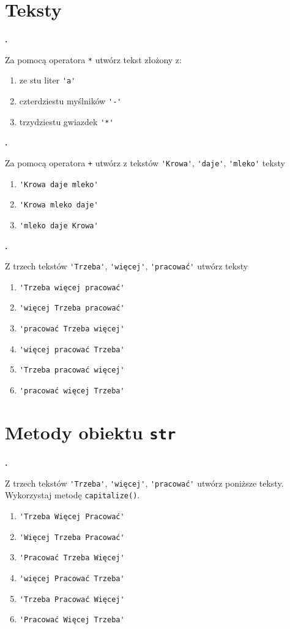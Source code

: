 \documentclass[a4paper]{article}
\begin{document}
\section{Teksty}
\textbf{.}\addtocounter{zadanie}{1} Za pomocą operatora \verb|*| utwórz tekst złożony z:
\begin{enumerate}[label=\arabic*.]
    \item ze stu liter \verb|'a'|
    \item czterdziestu myślników \verb|'-'|
    \item trzydziestu gwiazdek \verb|'*'|
\end{enumerate}


\textbf{.}\addtocounter{zadanie}{1} Za pomocą operatora \verb|+| utwórz z tekstów \verb|'Krowa'|, \verb|'daje'|, \verb|'mleko'| teksty
\begin{enumerate}[label=\arabic*.]
    \item \verb|'Krowa daje mleko'|
    \item \verb|'Krowa mleko daje'|
    \item \verb|'mleko daje Krowa'|
\end{enumerate}


\textbf{.}\addtocounter{zadanie}{1} Z trzech tekstów \verb|'Trzeba'|, \verb|'więcej'|, \verb|'pracować'| utwórz teksty
\begin{enumerate}[label=\arabic*.]
    \item \verb|'Trzeba więcej pracować'|
    \item \verb|'więcej Trzeba pracować'|
    \item \verb|'pracować Trzeba więcej'|
    \item \verb|'więcej pracować Trzeba'|
    \item \verb|'Trzeba pracować więcej'|
    \item \verb|'pracować więcej Trzeba'|
\end{enumerate}

\section{Metody obiektu \texttt{str}}

\textbf{.}\addtocounter{zadanie}{1} Z trzech tekstów \verb|'Trzeba'|, \verb|'więcej'|, \verb|'pracować'| utwórz poniższe teksty. Wykorzystaj metodę \verb|capitalize()|.
\begin{enumerate}[label=\arabic*.]
    \item \verb|'Trzeba Więcej Pracować'|
    \item \verb|'Więcej Trzeba Pracować'|
    \item \verb|'Pracować Trzeba Więcej'|
    \item \verb|'więcej Pracować Trzeba'|
    \item \verb|'Trzeba Pracować Więcej'|
    \item \verb|'Pracować Więcej Trzeba'|
\end{enumerate}
\end{document}
